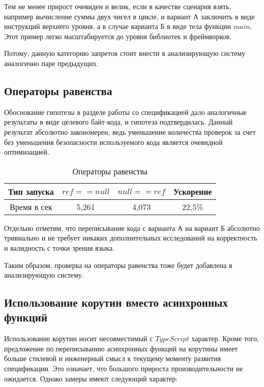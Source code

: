 \documentclass{mipt-thesis-bs}
\begin{document}
Тем не менее прирост очевиден и велик, если в качестве сценария взять, например
вычисление суммы двух чисел в цикле, и вариант А заключить в виде инструкций верхнего
уровня, а в случае варианта Б в виде тела функции $main$. Этот пример легко
масштабируется до уровня библиотек и фреймворков.

Потому, данную категорию запретов стоит внести в анализирующую систему аналогично
паре предыдущих.


\subsection{Операторы равенства}

Обоснование гипотезы в разделе работы со спецификацией дало аналогичные
результаты в виде целевого байт-кода, и гипотеза подтвердилась. Данный результат
абсолютно закономерен, ведь уменьшение количества проверок за счет без уменьшения
безопасности используемого кода является очевидной оптимизацией.

\begin{table}[h]
    \centering
    \begin{tabular}{|c|c|c|c|}
      \hline
      Тип запуска & $ref == null$ & $null == ref$ & Ускорение \\
      \hline
      Время в сек & 5,261 & 4,073 & 22,5\% \\
      \hline
    \end{tabular}
    \caption{Операторы равенства}
  \end{table}

Отдельно отметим, что переписывание
кода с варианта А на вариант Б абсолютно тривиально и не требует никаких дополнительных
исследований на корректность и валидность с точки зрения языка.

Таким образом, проверка
на операторы равенства тоже будет добавлена в анализирующую систему.

\subsection{Использование корутин вместо асинхронных функций}

Использование корутин носит несовместимый с $TypeScript$ характер. Кроме того,
предложение по переписыванию асинхронных функций на корутины имеет больше стилевой
и инженерный смысл к текущему моменту развития спецификации. Это означает, что
большого прироста производительности не ожидается. Однако замеры имеют следующий характер:
\end{document}
